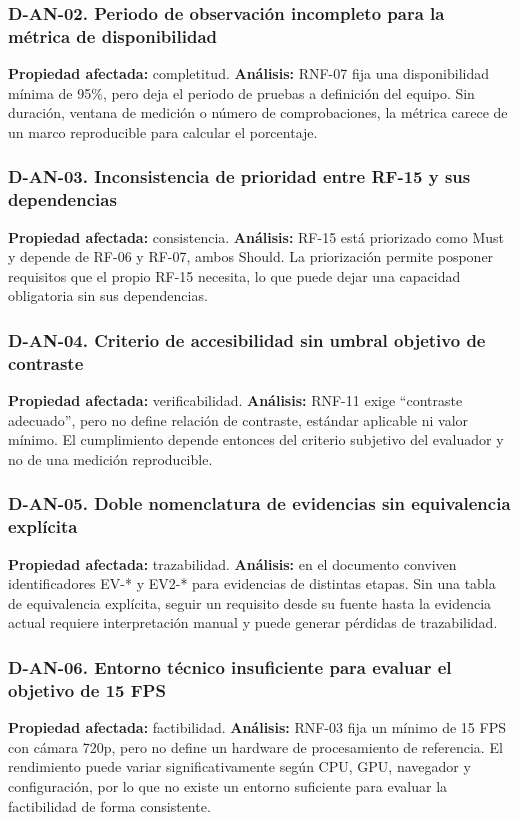 \documentclass[12pt,a4paper]{article}
\begin{document}
\subsubsection{D-AN-02. Periodo de observación incompleto para la métrica de disponibilidad}
\textbf{Propiedad afectada:} completitud.  
\textbf{Análisis:} RNF-07 fija una disponibilidad mínima de 95\%, pero deja el periodo de pruebas a definición del equipo. Sin duración, ventana de medición o número de comprobaciones, la métrica carece de un marco reproducible para calcular el porcentaje.

\subsubsection{D-AN-03. Inconsistencia de prioridad entre RF-15 y sus dependencias}
\textbf{Propiedad afectada:} consistencia.  
\textbf{Análisis:} RF-15 está priorizado como Must y depende de RF-06 y RF-07, ambos Should. La priorización permite posponer requisitos que el propio RF-15 necesita, lo que puede dejar una capacidad obligatoria sin sus dependencias.

\subsubsection{D-AN-04. Criterio de accesibilidad sin umbral objetivo de contraste}
\textbf{Propiedad afectada:} verificabilidad.  
\textbf{Análisis:} RNF-11 exige ``contraste adecuado'', pero no define relación de contraste, estándar aplicable ni valor mínimo. El cumplimiento depende entonces del criterio subjetivo del evaluador y no de una medición reproducible.

\subsubsection{D-AN-05. Doble nomenclatura de evidencias sin equivalencia explícita}
\textbf{Propiedad afectada:} trazabilidad.  
\textbf{Análisis:} en el documento conviven identificadores EV-* y EV2-* para evidencias de distintas etapas. Sin una tabla de equivalencia explícita, seguir un requisito desde su fuente hasta la evidencia actual requiere interpretación manual y puede generar pérdidas de trazabilidad.

\subsubsection{D-AN-06. Entorno técnico insuficiente para evaluar el objetivo de 15 FPS}
\textbf{Propiedad afectada:} factibilidad.  
\textbf{Análisis:} RNF-03 fija un mínimo de 15 FPS con cámara 720p, pero no define un hardware de procesamiento de referencia. El rendimiento puede variar significativamente según CPU, GPU, navegador y configuración, por lo que no existe un entorno suficiente para evaluar la factibilidad de forma consistente.
\end{document}
